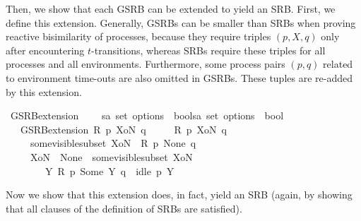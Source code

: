 \begin{isabellebody}
%
\endisatagproof
{\isafoldproof}%
%
\isadelimproof
%
\endisadelimproof
%
\begin{isamarkuptext}%
Then, we show that each GSRB can be extended to yield an SRB. First, we define this extension. Generally, GSRBs can be smaller than SRBs when proving reactive bisimilarity of processes, because they require triples $(p,X,q)$ only after encountering $t$-transitions, whereas SRBs require these triples for all processes and all environments. Furthermore, some process pairs $(p,q)$ related to environment time-outs are also omitted in GSRBs. These tuples are re-added by this extension.
\pagebreak%
\end{isamarkuptext}\isamarkuptrue%
\isamarkupfalse%
\ GSRB{\isacharunderscore}{\kern0pt}extension\ \isanewline
\ \ {\isacharcolon}{\kern0pt}{\isacharcolon}{\kern0pt}\ {\isacartoucheopen}{\isacharparenleft}{\kern0pt}{\isacharprime}{\kern0pt}s{\isasymRightarrow}{\isacharprime}{\kern0pt}a\ set\ option{\isasymRightarrow}{\isacharprime}{\kern0pt}s\ {\isasymRightarrow}\ bool{\isacharparenright}{\kern0pt}{\isasymRightarrow}{\isacharparenleft}{\kern0pt}{\isacharprime}{\kern0pt}s{\isasymRightarrow}{\isacharprime}{\kern0pt}a\ set\ option{\isasymRightarrow}{\isacharprime}{\kern0pt}s\ {\isasymRightarrow}\ bool{\isacharparenright}{\kern0pt}{\isacartoucheclose}\isanewline
\ \ \ {\isacartoucheopen}{\isacharparenleft}{\kern0pt}GSRB{\isacharunderscore}{\kern0pt}extension\ R{\isacharparenright}{\kern0pt}\ p\ XoN\ q\ {\isasymequiv}\isanewline
\ \ \ \ {\isacharparenleft}{\kern0pt}R\ p\ XoN\ q{\isacharparenright}{\kern0pt}\isanewline
\ \ \ \ {\isasymor}\ {\isacharparenleft}{\kern0pt}some{\isacharunderscore}{\kern0pt}visible{\isacharunderscore}{\kern0pt}subset\ XoN\ {\isasymand}\ R\ p\ None\ q{\isacharparenright}{\kern0pt}\isanewline
\ \ \ \ {\isasymor}\ {\isacharparenleft}{\kern0pt}{\isacharparenleft}{\kern0pt}XoN\ {\isacharequal}{\kern0pt}\ None\ {\isasymor}\ some{\isacharunderscore}{\kern0pt}visible{\isacharunderscore}{\kern0pt}subset\ XoN{\isacharparenright}{\kern0pt}\ \isanewline
\ \ \ \ \ \ {\isasymand}\ {\isacharparenleft}{\kern0pt}{\isasymexists}\ Y{\isachardot}{\kern0pt}\ R\ p\ {\isacharparenleft}{\kern0pt}Some\ Y{\isacharparenright}{\kern0pt}\ q\ {\isasymand}\ idle\ p\ Y{\isacharparenright}{\kern0pt}{\isacharparenright}{\kern0pt}{\isacartoucheclose}%
\begin{isamarkuptext}%
Now we show that this extension does, in fact, yield an SRB (again, by showing that all clauses of the definition of SRBs are satisfied).%
\end{isamarkuptext}\isamarkuptrue%

\end{isabellebody}
